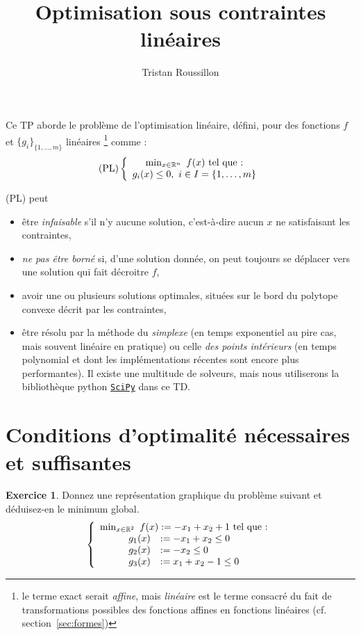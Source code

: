 \documentclass[a4paper,francais]{article}
\title{Optimisation sous contraintes linéaires}
\author{Tristan Roussillon}
\newcommand{\R}{{\ensuremath\mathbb{R}}}
\theoremstyle{definition}
\newtheorem{exercice}{Exercice}[section]
\begin{document}
\maketitle

Ce TP aborde le problème de l'optimisation linéaire, défini,
pour des fonctions $f$ et $\{g_i\}_{\{1, \dots, m\}}$ linéaires
\footnote{le terme exact serait \emph{affine}, mais \emph{linéaire}
  est le terme consacré du fait de transformations possibles des
  fonctions affines en fonctions linéaires (cf. section~\ref{sec:formes})}
comme :
\[
\text{(PL)} \left\{
\begin{array}{c}
  \min_{x \in \R^n} \ f(x) \ \text{tel que :} \\
  g_i(x) \leq 0, \ i \in I = \{1, \dots, m\} \\
\end{array}
\right.
\]

(PL) peut
\begin{itemize}
\item être \emph{infaisable} s'il n'y aucune solution,
  c'est-à-dire aucun $x$ ne satisfaisant les contraintes,
\item \emph{ne pas être borné} si, d'une solution donnée, on peut
  toujours se déplacer vers une solution qui fait décroitre $f$,
\item avoir une ou plusieurs solutions optimales, situées
  sur le bord du polytope convexe décrit par les contraintes,
\item être résolu par la méthode du \emph{simplexe}
  (en temps exponentiel au pire cas, mais souvent linéaire en
  pratique) ou celle \emph{des points intérieurs} (en temps
  polynomial et dont les implémentations récentes sont encore
  plus performantes). Il existe une multitude de solveurs,
  mais nous utiliserons la bibliothèque python
  \href{https://docs.scipy.org/doc/}{\texttt{SciPy}} dans
  ce TD.
\end{itemize} 

\section{Conditions d'optimalité nécessaires et suffisantes}
\label{sec:conditions}

\begin{exercice}
  \label{ex:ex}
  Donnez une représentation graphique du problème suivant
  et déduisez-en le minimum global.
  \[
\left\{
\begin{array}{c}
  \min_{x \in \R^2} \ f(x) := -x_1 + x_2 + 1 \ \text{tel que :} \\
  \begin{array}{ll}
    g_1(x) &:= -x_1 + x_2 \leq 0 \\
    g_2(x) &:= -x_2 \leq 0 \\
    g_3(x) &:= x_1 + x_2 - 1 \leq 0 \\
  \end{array} 
\end{array}
\right.
\]
\end{exercice}
\end{document}
